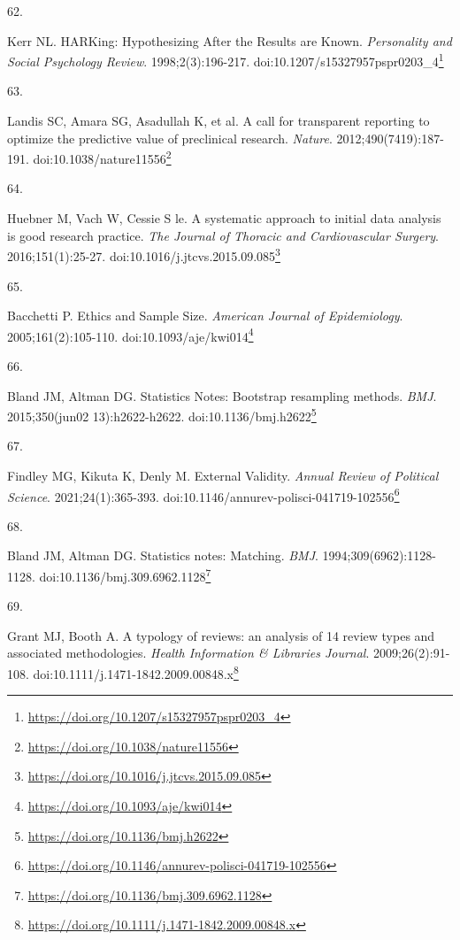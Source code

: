 \documentclass[
]{book}
\newlength{\cslhangindent}
\newlength{\csllabelwidth}
\newlength{\cslentryspacingunit} %
\newenvironment{CSLReferences}[2] %
 {%
  \setlength{\parindent}{0pt}
  \ifodd #1
  \let\oldpar\par
  \def\par{\hangindent=\cslhangindent\oldpar}
  \fi
  \setlength{\parskip}{#2\cslentryspacingunit}
 }%
 {}
\newcommand{\CSLLeftMargin}[1]{\parbox[t]{\csllabelwidth}{#1}}
\newcommand{\CSLRightInline}[1]{\parbox[t]{\linewidth - \csllabelwidth}{#1}\break}
\renewcommand{\href}[2]{#2\footnote{\url{#1}}}
\begin{document}
\begin{CSLReferences}{0}{0}
\leavevmode{}%
\CSLLeftMargin{62. }%
\CSLRightInline{Kerr NL. HARKing: Hypothesizing After the Results are Known. \emph{Personality and Social Psychology Review}. 1998;2(3):196-217. doi:\href{https://doi.org/10.1207/s15327957pspr0203_4}{10.1207/s15327957pspr0203\_4}}

\leavevmode{}%
\CSLLeftMargin{63. }%
\CSLRightInline{Landis SC, Amara SG, Asadullah K, et al. A call for transparent reporting to optimize the predictive value of preclinical research. \emph{Nature}. 2012;490(7419):187-191. doi:\href{https://doi.org/10.1038/nature11556}{10.1038/nature11556}}

\leavevmode{}%
\CSLLeftMargin{64. }%
\CSLRightInline{Huebner M, Vach W, Cessie S le. A systematic approach to initial data analysis is good research practice. \emph{The Journal of Thoracic and Cardiovascular Surgery}. 2016;151(1):25-27. doi:\href{https://doi.org/10.1016/j.jtcvs.2015.09.085}{10.1016/j.jtcvs.2015.09.085}}

\leavevmode{}%
\CSLLeftMargin{65. }%
\CSLRightInline{Bacchetti P. Ethics and Sample Size. \emph{American Journal of Epidemiology}. 2005;161(2):105-110. doi:\href{https://doi.org/10.1093/aje/kwi014}{10.1093/aje/kwi014}}

\leavevmode{}%
\CSLLeftMargin{66. }%
\CSLRightInline{Bland JM, Altman DG. Statistics Notes: Bootstrap resampling methods. \emph{BMJ}. 2015;350(jun02 13):h2622-h2622. doi:\href{https://doi.org/10.1136/bmj.h2622}{10.1136/bmj.h2622}}

\leavevmode{}%
\CSLLeftMargin{67. }%
\CSLRightInline{Findley MG, Kikuta K, Denly M. External Validity. \emph{Annual Review of Political Science}. 2021;24(1):365-393. doi:\href{https://doi.org/10.1146/annurev-polisci-041719-102556}{10.1146/annurev-polisci-041719-102556}}

\leavevmode{}%
\CSLLeftMargin{68. }%
\CSLRightInline{Bland JM, Altman DG. Statistics notes: Matching. \emph{BMJ}. 1994;309(6962):1128-1128. doi:\href{https://doi.org/10.1136/bmj.309.6962.1128}{10.1136/bmj.309.6962.1128}}

\leavevmode{}%
\CSLLeftMargin{69. }%
\CSLRightInline{Grant MJ, Booth A. A typology of reviews: an analysis of 14 review types and associated methodologies. \emph{Health Information \& Libraries Journal}. 2009;26(2):91-108. doi:\href{https://doi.org/10.1111/j.1471-1842.2009.00848.x}{10.1111/j.1471-1842.2009.00848.x}}


\end{CSLReferences}
\end{document}
